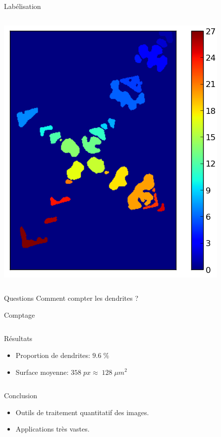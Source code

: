 \documentclass[8pt,a4paper]{beamer}
\begin{document}
\begin{frame}{Labélisation}
 \begin{columns}
\includegraphics[width=1.\textwidth]{figures/image_labels.png}

\end{columns}
\begin{alertblock}{Questions}
Comment compter les dendrites ? 
\end{alertblock}
\end{frame}

\begin{frame}{Comptage}
 \begin{columns}
\begin{block}{Résultats}
\begin{itemize}
\item Proportion de dendrites: $9.6\;\%$
\item Surface moyenne: $358 \; px \approx \;128 \; \mu m^2$ 

\end{itemize}
\end{block}

\end{columns}
\begin{alertblock}{Conclusion}
\begin{itemize}
\item Outils de traitement quantitatif des images.
\item Applications très vastes.
\end{itemize} 
\end{alertblock}
\end{frame}
\end{document}
